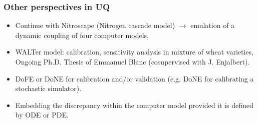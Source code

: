 \documentclass[nopagenumber,9pt]{beamer}
\newcommand{\by}{\mathbf{y}}
\newcommand{\brho}{\boldsymbol{\rho}}
\newcommand{\bgamma}{\boldsymbol{\gamma}}
\newcommand{\bneta}{\boldsymbol{\eta}}
\newcommand{\M}{\mathcal{M}}
\begin{document}
%  
%  
%  
%  
% 


 
%  
% 


\begin{frame}
 \frametitle{Other perspectives in UQ}
 
 \begin{itemize}
  \item Continue with Nitroscape (Nitrogen cascade model) \cite{ferrer} $\rightarrow$ emulation of  a dynamic coupling of four computer models,
  
  \smallskip
  \item WALTer model: calibration, sensitivity analysis in mixture of wheat varieties, Ongoing Ph.D. Thesis of Emmanuel Blanc (cosupervised with J. Enjalbert).
  
  \smallskip
%   
  \item DoFE or DoNE for calibration and/or validation (e.g. DoNE for calibrating a stochastic simulator).
  
  \smallskip
  \item Embedding the discrepancy within the computer model provided it is defined by ODE or PDE.
  
  
 \end{itemize}

 
%  
\end{frame}
\end{document}
